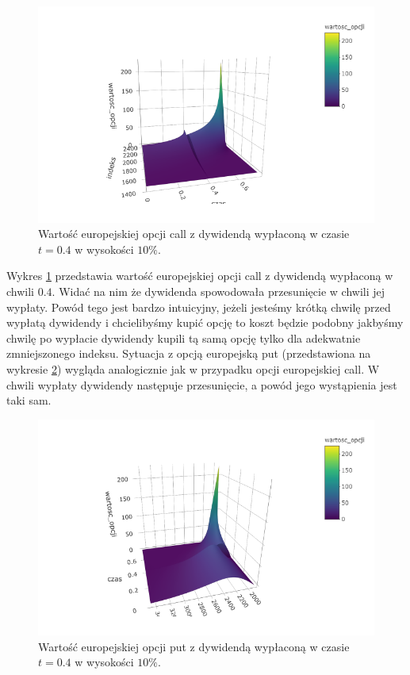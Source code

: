 \documentclass[12pt]{article}
\begin{document}
\begin{figure}[H]
    \centering
    \includegraphics[width=\textwidth,height=\textheight,keepaspectratio]{dividend/call_EU_dywidenda.png}
    \caption{Wartość europejskiej opcji call z dywidendą wypłaconą w czasie $t = 0.4$ w wysokości $10\%$.}
    \label{fig:divi_call_EU}
\end{figure}

Wykres \ref{fig:divi_call_EU} przedstawia wartość europejskiej opcji call z dywidendą wypłaconą w chwili $0.4$. Widać na nim że dywidenda spowodowała przesunięcie w chwili jej wypłaty. Powód tego jest bardzo intuicyjny, jeżeli jesteśmy krótką chwilę przed wypłatą dywidendy i chcielibyśmy kupić opcję to koszt będzie podobny jakbyśmy chwilę po  wypłacie dywidendy kupili tą samą opcję tylko dla adekwatnie zmniejszonego indeksu. Sytuacja z opcją europejską put (przedstawiona na wykresie \ref{fig:divi_put_EU}) wygląda analogicznie jak w przypadku opcji europejskiej call. W chwili wypłaty dywidendy następuje przesunięcie, a powód jego wystąpienia jest taki sam.

\begin{figure}[H]
    \centering
    \includegraphics[width=\textwidth,height=\textheight,keepaspectratio]{dividend/put_EU_dywidenda.png}
    \caption{Wartość europejskiej opcji put z dywidendą wypłaconą w czasie $t = 0.4$ w wysokości $10\%$.}
    \label{fig:divi_put_EU}
\end{figure}
\end{document}
